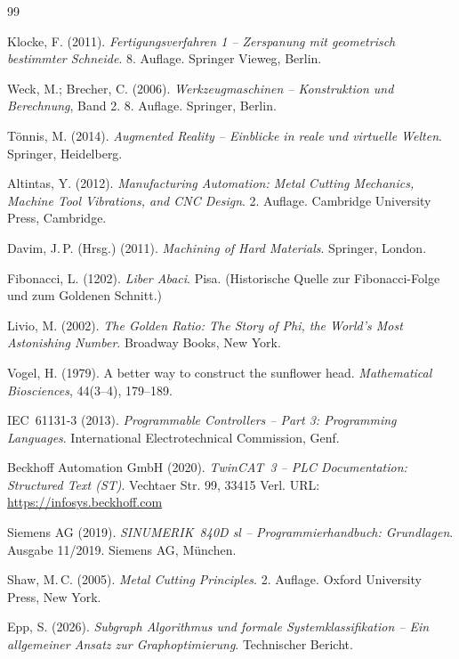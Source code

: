﻿\documentclass[12pt,a4paper]{article}
\begin{document}
\renewcommand{\refname}{Literaturverzeichnis}
\begin{thebibliography}{99}

Klocke, F. (2011).
\textit{Fertigungsverfahren 1 -- Zerspanung mit geometrisch bestimmter Schneide}.
8. Auflage. Springer Vieweg, Berlin.

Weck, M.; Brecher, C. (2006).
\textit{Werkzeugmaschinen -- Konstruktion und Berechnung}, Band 2.
8. Auflage. Springer, Berlin.

Tönnis, M. (2014).
\textit{Augmented Reality -- Einblicke in reale und virtuelle Welten}.
Springer, Heidelberg.

Altintas, Y. (2012).
\textit{Manufacturing Automation: Metal Cutting Mechanics, Machine Tool Vibrations, and CNC Design}.
2. Auflage. Cambridge University Press, Cambridge.

Davim, J.\,P. (Hrsg.) (2011).
\textit{Machining of Hard Materials}.
Springer, London.

Fibonacci, L. (1202).
\textit{Liber Abaci}.
Pisa. (Historische Quelle zur Fibonacci-Folge und zum Goldenen Schnitt.)

Livio, M. (2002).
\textit{The Golden Ratio: The Story of Phi, the World's Most Astonishing Number}.
Broadway Books, New York.

Vogel, H. (1979).
A better way to construct the sunflower head.
\textit{Mathematical Biosciences}, 44(3--4), 179--189.

IEC~61131-3 (2013).
\textit{Programmable Controllers -- Part 3: Programming Languages}.
International Electrotechnical Commission, Genf.

Beckhoff Automation GmbH (2020).
\textit{TwinCAT~3 -- PLC Documentation: Structured Text (ST)}.
Vechtaer Str. 99, 33415 Verl.
URL: \url{https://infosys.beckhoff.com}

Siemens AG (2019).
\textit{SINUMERIK~840D sl -- Programmierhandbuch: Grundlagen}.
Ausgabe 11/2019. Siemens AG, München.

Shaw, M.\,C. (2005).
\textit{Metal Cutting Principles}.
2. Auflage. Oxford University Press, New York.

Epp, S. (2026).
\textit{Subgraph Algorithmus und formale Systemklassifikation -- Ein allgemeiner Ansatz zur Graphoptimierung}.
Technischer Bericht.

\end{thebibliography}
\end{document}
